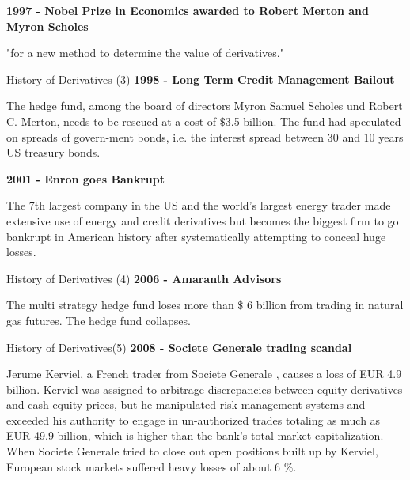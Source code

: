 
\textbf{1997 - Nobel Prize in Economics awarded to Robert Merton and Myron Scholes}


	"for a new method to determine the value of derivatives."


{History of Derivatives (3)}
\textbf{1998 - Long Term Credit Management Bailout}


	The hedge fund, among the board of directors Myron Samuel Scholes und Robert C. Merton, needs to be rescued at a cost of $\$$3.5 billion. The fund had speculated on spreads of govern-ment bonds, i.e. the interest spread between 30 and 10 years US treasury bonds.


\textbf{2001 - Enron goes Bankrupt}


	The 7th largest company in the US and the world's largest energy trader made extensive use of energy and credit derivatives but becomes the biggest firm to go bankrupt in American history after systematically attempting to conceal huge losses.


{History of Derivatives (4)}
\textbf{2006 - Amaranth Advisors}


	The multi strategy hedge fund loses more than $\$$ 6 billion from trading in natural gas futures. The hedge fund collapses.


{History of Derivatives(5)}
\textbf{2008 - Societe Generale trading scandal}


	Jerume Kerviel, a French trader from Societe Generale , causes a loss of EUR 4.9 billion. Kerviel was assigned to arbitrage discrepancies between equity derivatives and cash equity prices, but he manipulated risk management systems and exceeded his authority to engage in un-authorized trades totaling as much as EUR 49.9 billion, which is higher than the bank's total market capitalization. When Societe Generale  tried to close out open positions built up by Kerviel, European stock markets suffered heavy losses of about 6 $\%$.


